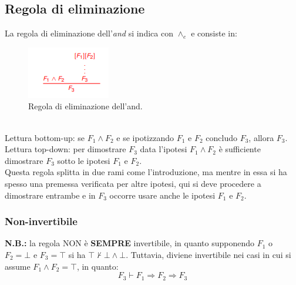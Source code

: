 \documentclass[12pt]{article}
\begin{document}
\subsection{Regola di eliminazione}
La regola di eliminazione dell'\textit{and} si indica con $\wedge_e$ e consiste in:
\begin{figure}[!htb]
    \centering
    \includegraphics[width=.9\linewidth,height=.40\textheight,keepaspectratio]{logica_proposizionale/introduzione/eliminazione_and.png} %
    \begin{center}
        \caption{\label{fig:eliminazione_and}Regola di eliminazione dell'and.} %
    \end{center}
\end{figure}\\
Lettura bottom-up: se $F_1 \wedge F_2$ e se ipotizzando $F_1$ e $F_2$ concludo $F_3$, allora $F_3$.\\
Lettura top-down: per dimostrare $F_3$ data l'ipotesi $F_1 \wedge F_2$ è sufficiente dimostrare $F_3$ sotto le ipotesi $F_1$ e $F_2$.\\
Questa regola splitta in due rami come l'introduzione, ma mentre in essa si ha spesso una premessa verificata per altre ipotesi, qui si deve procedere a dimostrare entrambe e in $F_3$ occorre usare anche le ipotesi $F_1$ e $F_2$.
\subsubsection{Non-invertibile}
\textbf{N.B.:} la regola NON è \textbf{SEMPRE} invertibile, in quanto supponendo $F_1$ o $F_2 = \bot$ e $F_3 = \top$ si ha $\top \not\vdash \bot \wedge \bot$.
Tuttavia, diviene invertibile nei casi in cui si assume $F_1 \wedge F_2 = \top$, in quanto:
\[F_3 \vdash F_1 \Rightarrow F_2 \Rightarrow F_3\]
\end{document}
